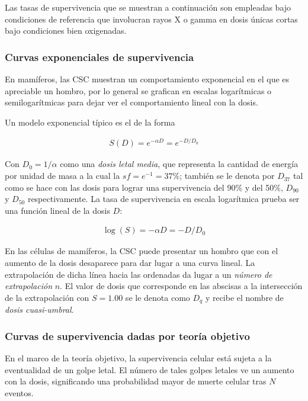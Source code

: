 \documentclass[12pt,letterpaper, oneside]{book}
\begin{document}
			Las tasas de supervivencia que se muestran a continuación son empleadas bajo condiciones de referencia que involucran rayos X o gamma en dosis únicas cortas bajo condiciones bien oxigenadas. 
			
			\subsubsection{Curvas exponenciales de supervivencia}
			En mamíferos, las CSC muestran un comportamiento exponencial en el que es apreciable un hombro, por lo general se grafican en escalas logarítmicas o semilogarítmicas para dejar ver el comportamiento lineal con la dosis\cite{Mayles.2007, Tubiana.1990}. 
			
			Un modelo exponencial típico es el de la forma
			
			\begin{eqnarray}
			S(D)=e^{-\alpha D}=e^{-D/D_0} \label{exponencial_csc_dosis_lineal}
			\end{eqnarray}
			
			Con $D_0=1/\alpha$ como una \textit{dosis letal media}, que representa la cantidad de energía por unidad de masa a la cual la $sf=e^{-1}=37\%$; también se le denota por $D_{37}$\cite{Tubiana.1990} tal como se hace con las dosis para lograr una supervivencia del 90\% y del 50\%, $D_{90}$ y $D_{50}$ respectivamente\cite{Mayles.2007}. La tasa de supervivencia en escala logarítmica prueba ser una función lineal de la dosis $D$:
			
			\begin{eqnarray}
				\log(S) = -\alpha D=-D/D_0 \label{logaritmica_csc_dosis_lineal}
			\end{eqnarray}
			
			En las células de mamíferos, la CSC puede presentar un hombro que con el aumento de la dosis desaparece para dar lugar a una curva lineal. La extrapolación de dicha línea hacia las ordenadas da lugar a un \textit{número de extrapolación} $n$\cite{Tubiana.1990}. El valor de dosis que corresponde en las abscisas a la intersección de la extrapolación con $S=1.00$ se le denota como $D_q$ y recibe el nombre de \textit{dosis cuasi-umbral}\cite{Tubiana.1990}.  
			
			\subsubsection{Curvas de supervivencia dadas por teoría objetivo}
			En el marco de la teoría objetivo, la supervivencia celular está sujeta a la eventualidad de un golpe letal. El número de tales golpes letales ve un aumento con la dosis, significando una probabilidad mayor de muerte celular tras $N$ eventos\cite{Tubiana.1990, Hall.2000}.
			
\end{document}
